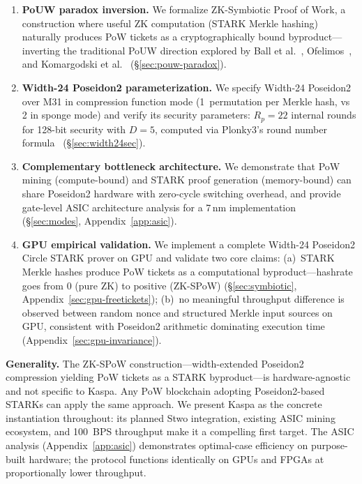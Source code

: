 \documentclass[11pt,a4paper]{article}
\begin{document}
\begin{enumerate}
\item \textbf{PoUW paradox inversion.} We formalize ZK-Symbiotic Proof of Work, a construction where useful ZK computation (STARK Merkle hashing) naturally produces PoW tickets as a cryptographically bound byproduct---inverting the traditional PoUW direction explored by Ball et al.~\cite{ball2017}, Ofelimos~\cite{ofelimos}, and Komargodski et al.~\cite{komargodski2025,baron2025} (\S\ref{sec:pouw-paradox}).

\item \textbf{Width-24 Poseidon2 parameterization.} We specify Width-24 Poseidon2 over M31 in compression function mode (1~permutation per Merkle hash, vs 2 in sponge mode) and verify its security parameters: $R_p = 22$ internal rounds for 128-bit security with $D = 5$, computed via Plonky3's round number formula~\cite{plonky3} (\S\ref{sec:width24sec}).

\item \textbf{Complementary bottleneck architecture.} We demonstrate that PoW mining (compute-bound) and STARK proof generation (memory-bound) can share Poseidon2 hardware with zero-cycle switching overhead, and provide gate-level ASIC architecture analysis for a 7\,nm implementation (\S\ref{sec:modes}, Appendix~\ref{app:asic}).

\item \textbf{GPU empirical validation.} We implement a complete Width-24 Poseidon2 Circle STARK prover on GPU and validate two core claims: (a)~STARK Merkle hashes produce PoW tickets as a computational byproduct---hashrate goes from 0 (pure ZK) to positive (ZK-SPoW) (\S\ref{sec:symbiotic}, Appendix~\ref{sec:gpu-freetickets}); (b)~no meaningful throughput difference is observed between random nonce and structured Merkle input sources on GPU, consistent with Poseidon2 arithmetic dominating execution time (Appendix~\ref{sec:gpu-invariance}).
\end{enumerate}

\textbf{Generality.} The ZK-SPoW construction---width-extended Poseidon2 compression yielding PoW tickets as a STARK byproduct---is hardware-agnostic and not specific to Kaspa. Any PoW blockchain adopting Poseidon2-based STARKs can apply the same approach. We present Kaspa as the concrete instantiation throughout: its planned Stwo integration, existing ASIC mining ecosystem, and 100~BPS throughput make it a compelling first target. The ASIC analysis (Appendix~\ref{app:asic}) demonstrates optimal-case efficiency on purpose-built hardware; the protocol functions identically on GPUs and FPGAs at proportionally lower throughput.
\end{document}
